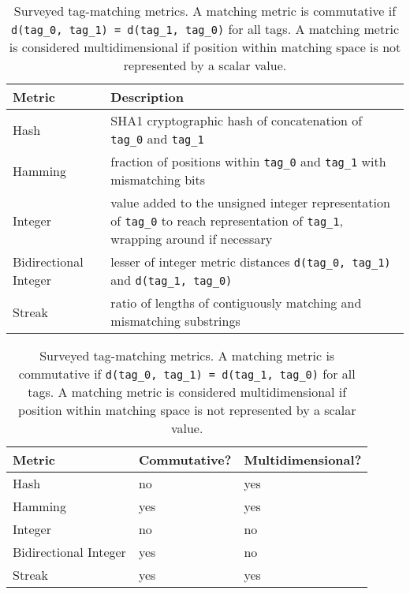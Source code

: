 \begin{table}[!htbp]
\begin{tabularx}{\textwidth}{l|X}
\textbf{Metric}       & \textbf{Description}                                                                                                                                        \\ \hline
Hash                  & SHA1 cryptographic hash of  concatenation of \texttt{tag\_0} and \texttt{tag\_1} \citep{eastlake2001us}                         \\ \hline
Hamming               & fraction of positions within \texttt{tag\_0} and \texttt{tag\_1} with mismatching bits                                                                         \\ \hline
Integer               & value added to the unsigned integer representation of \texttt{tag\_0} to reach representation of \texttt{tag\_1}, wrapping around if necessary \\ \hline
Bidirectional Integer & lesser of integer metric distances \texttt{d(tag\_0, tag\_1)} and \texttt{d(tag\_1, tag\_0)}                                                                \\ \hline
Streak                & ratio of lengths of contiguously matching and mismatching substrings \\ \hline
\end{tabularx}

\begin{tabularx}{\textwidth}{l|X|X}
\hline
\textbf{Metric}       & \textbf{Commutative?} & \textbf{Multidimensional?} \\ \hline
Hash                  & no                    & yes                        \\ \hline
Hamming               & yes                   & yes                        \\ \hline
Integer               & no                    & no                         \\ \hline
Bidirectional Integer & yes                   & no                         \\ \hline
Streak                & yes                   & yes
\end{tabularx}

\caption{
Surveyed tag-matching metrics. A matching metric is commutative if \texttt{d(tag\_0, tag\_1) = d(tag\_1, tag\_0)} for all tags.
A matching metric is considered multidimensional if position within matching space is not represented by a scalar value.
}
\label{tab:metrics}

\end{table}
